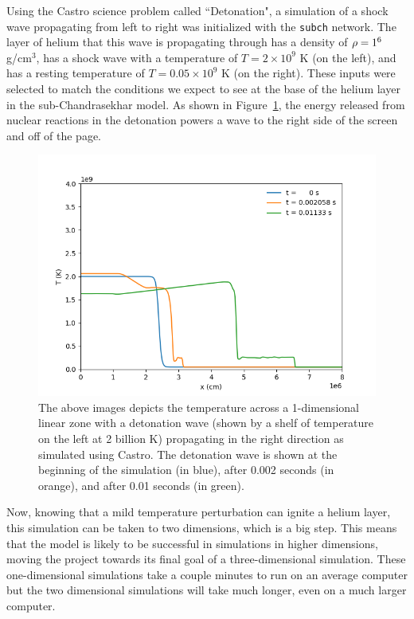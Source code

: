 \documentclass[preprint]{aastex62}
\begin{document}
      Using the Castro science problem called ``Detonation", a simulation of a shock wave propagating from left to right was initialized with the {\tt subch} network. The layer of helium that this wave is propagating through has a density of $\rho = 1 \time 10^6$ g/cm$^3$, has a shock wave with a temperature of $T = 2 \times 10^9$ K (on the left), and has a resting temperature of $T = 0.05 \times 10^9$ K (on the right). These inputs were selected to match the conditions we expect to see at the base of the helium layer in the sub-Chandrasekhar model. As shown in Figure~\ref{fig:detonation}, the energy released from nuclear reactions in the detonation powers a wave to the right side of the screen and off of the page. 
      
    \begin{figure}
      \centering
      \includegraphics[width=5in]{images/flame-thesis}
      \caption{The above images depicts the temperature across a 1-dimensional linear zone with a detonation wave (shown by a shelf of temperature on the left at 2 billion K) propagating in the right direction as simulated using Castro. The detonation wave is shown at the beginning of the simulation (in blue), after 0.002 seconds (in orange), and after 0.01 seconds (in green).}
      \label{fig:detonation}
    \end{figure}
      
      Now, knowing that a mild temperature perturbation can ignite a helium layer, this simulation can be taken to two dimensions, which is a big step. This means that the model is likely to be successful in simulations in higher dimensions, moving the project towards its final goal of a three-dimensional simulation. These one-dimensional simulations take a couple minutes to run on an average computer but the two dimensional simulations will take much longer, even on a much larger computer. 
     
\end{document}
